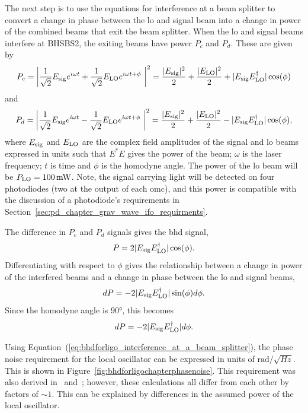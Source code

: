 \par
The next step is to use the equations for interference at a beam splitter to convert a change in phase between the \gls{lo} and signal beam into a change in power of the combined beams that exit the beam splitter. When the \gls{lo} and signal beams interfere at BHSBS2, the exiting beams have power $P_c$ and $P_d$. These are given by
\begin{equation}
P_c = \left|\frac{1}{\sqrt{2}}E_{\rm{sig}} e^{i\omega t} + \frac{1}{\sqrt{2}}E_{\rm{LO}} e^{i\omega t + \phi}  \right|^2 = \frac{|E_{\rm{sig}}|^2}{2} + \frac{|E_{\rm{LO}}|^2}{2} + |E_{\rm{sig}}E^\dagger_{\rm{LO}}|\cos(\phi)
\end{equation}
and
\begin{equation}
P_d = \left|\frac{1}{\sqrt{2}}E_{\rm{sig}} e^{i\omega t} - \frac{1}{\sqrt{2}}E_{\rm{LO}} e^{i\omega t + \phi}  \right|^2 = \frac{|E_{\rm{sig}}|^2}{2} + \frac{|E_{\rm{LO}}|^2}{2} - |E_{\rm{sig}}E^\dagger_{\rm{LO}}|\cos(\phi),
\end{equation}
where $E_{\rm{sig}}$ and $E_{\rm{LO}}$ are the complex field amplitudes of the signal and \gls{lo} beams expressed in units such that $E^*E$ gives the power of the beam; $\omega$ is the laser frequency; $t$ is time and $\phi$ is the homodyne angle. The power of the \gls{lo} beam will be $P_{\rm{LO}} = 100\,\si{\milli\watt}$. Note, the signal carrying light will be detected on four photodiodes (two at the output of each \gls{omc}), and this power is compatible with the discussion of a photodiode's requirements in Section~\ref{sec:pd_chapter_grav_wave_ifo_requirments}.
\par
The difference in $P_c$ and $P_d$ signals gives the \gls{bhd} signal,
\begin{equation}
P = 2|E_{\rm{sig}}E^\dagger_{\rm{LO}}|\cos(\phi).
\label{eq:classical_bhd}
\end{equation}
Differentiating with respect to $\phi$ gives the relationship between a change in power of the interfered beams and a change in phase between the \gls{lo} and signal beams,
\begin{equation}
dP = -2|E_{\rm{sig}}E^\dagger_{\rm{LO}}|\sin(\phi) d\phi.
\end{equation}
Since the homodyne angle is 90\si{\degree}, this becomes
\begin{equation}
dP = -2|E_{\rm{sig}}E^\dagger_{\rm{LO}}|d\phi.
\label{eq:bhdforligo_interference_at_a_beam_splitter}
\end{equation}
\par
Using Equation~(\ref{eq:bhdforligo_interference_at_a_beam_splitter}), the phase noise requirement for the local oscillator can be expressed in units of $\si{\radian/\sqrt{Hz}}$. This is shown in Figure~\ref{fig:bhdforligochapterphasenoise}. This requirement was also derived in~\cite{Zhang2019,Fritschel_bhd_requirements} and~\cite{HRTSrequirement}; however, these calculations all differ from each other by factors of $\sim\!1$. This can be explained by differences in the assumed power of the local oscillator.
